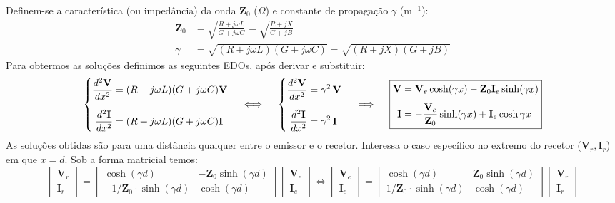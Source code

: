 \noindent Definem-se a característica (ou impedância) da onda $\mathbf{Z}_0$ ($\Omega$) e constante de propagação $\gamma$ (m$^{-1}$):
$$
    \begin{aligned}
        \mathbf{Z}_0 &= \sqrt{\frac{R + j\omega L}{G + j\omega C}} = \sqrt{\frac{R + jX}{G + jB}} \\
        \gamma &= \sqrt{(R + j\omega L)(G + j\omega C)} = \sqrt{(R + jX)(G + jB)}
    \end{aligned}
$$
Para obtermos as soluções definimos as seguintes EDOs, após derivar e substituir:
$$
    \left\{
    \begin{aligned}
        \frac{d^2 \mathbf{V}}{dx^2} &= (R + j\omega L)(G + j\omega C) \mathbf{V} \\[6pt]
        \frac{d^2 \mathbf{I}}{dx^2} &= (R + j\omega L)(G + j\omega C) \mathbf{I}
    \end{aligned}\right.
    \quad\iff\quad
    \left\{
    \begin{aligned}
        \frac{d^2 \mathbf{V}}{dx^2} &= \gamma^2\, \mathbf{V} \\[6pt]
        \frac{d^2 \mathbf{I}}{dx^2} &= \gamma^2\, \mathbf{I}
    \end{aligned}\right.
    \quad\implies\quad
    \boxed{%
    \begin{aligned}
        \mathbf{V} &= \mathbf{V}_e \cosh(\gamma x) - \mathbf{Z}_0 \mathbf{I}_e \sinh(\gamma x) \\[4pt]
        \mathbf{I} &= -\frac{\mathbf{V}_e}{\mathbf{Z}_0} \sinh(\gamma x) + \mathbf{I}_e \cosh{\gamma x}
    \end{aligned}}
$$
As soluções obtidas são para uma distância qualquer entre o emissor e o recetor. Interessa o caso específico no extremo do recetor ($\mathbf{V}_r, \mathbf{I}_r$) em que $x = d$. Sob a forma matricial temos:
$$
    \begin{bmatrix}
        \mathbf{V}_r \\[6pt]
        \mathbf{I}_r
    \end{bmatrix}
    =
    \begin{bmatrix}
        \cosh(\gamma d) & -\mathbf{Z}_0 \sinh(\gamma d) \\[6pt]
        -1/\mathbf{Z}_0 \cdot \sinh(\gamma d) & \cosh(\gamma d)
    \end{bmatrix}
    \begin{bmatrix}
        \mathbf{V}_e \\[6pt]
        \mathbf{I}_e
    \end{bmatrix}
    \iff 
    \begin{bmatrix}
        \mathbf{V}_e \\[6pt]
        \mathbf{I}_e
    \end{bmatrix}
    =
    \begin{bmatrix}
        \cosh(\gamma d) & \mathbf{Z}_0 \sinh(\gamma d) \\[6pt]
        1/\mathbf{Z}_0 \cdot \sinh(\gamma d) & \cosh(\gamma d)
    \end{bmatrix}
    \begin{bmatrix}
        \mathbf{V}_r \\[6pt]
        \mathbf{I}_r
    \end{bmatrix}
$$

